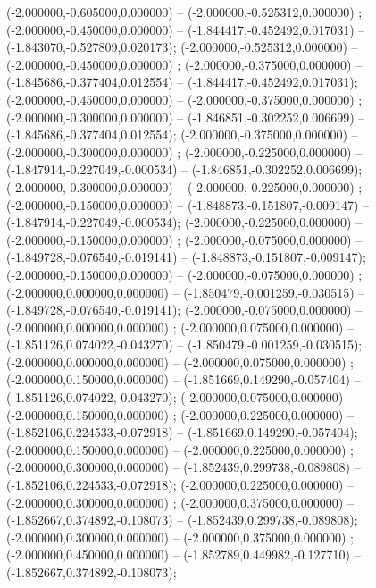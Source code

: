  (-2.000000,-0.605000,0.000000) -- (-2.000000,-0.525312,0.000000) ;
 (-2.000000,-0.450000,0.000000) -- (-1.844417,-0.452492,0.017031) -- (-1.843070,-0.527809,0.020173);
 (-2.000000,-0.525312,0.000000) -- (-2.000000,-0.450000,0.000000) ;
 (-2.000000,-0.375000,0.000000) -- (-1.845686,-0.377404,0.012554) -- (-1.844417,-0.452492,0.017031);
 (-2.000000,-0.450000,0.000000) -- (-2.000000,-0.375000,0.000000) ;
 (-2.000000,-0.300000,0.000000) -- (-1.846851,-0.302252,0.006699) -- (-1.845686,-0.377404,0.012554);
 (-2.000000,-0.375000,0.000000) -- (-2.000000,-0.300000,0.000000) ;
 (-2.000000,-0.225000,0.000000) -- (-1.847914,-0.227049,-0.000534) -- (-1.846851,-0.302252,0.006699);
 (-2.000000,-0.300000,0.000000) -- (-2.000000,-0.225000,0.000000) ;
 (-2.000000,-0.150000,0.000000) -- (-1.848873,-0.151807,-0.009147) -- (-1.847914,-0.227049,-0.000534);
 (-2.000000,-0.225000,0.000000) -- (-2.000000,-0.150000,0.000000) ;
 (-2.000000,-0.075000,0.000000) -- (-1.849728,-0.076540,-0.019141) -- (-1.848873,-0.151807,-0.009147);
 (-2.000000,-0.150000,0.000000) -- (-2.000000,-0.075000,0.000000) ;
 (-2.000000,0.000000,0.000000) -- (-1.850479,-0.001259,-0.030515) -- (-1.849728,-0.076540,-0.019141);
 (-2.000000,-0.075000,0.000000) -- (-2.000000,0.000000,0.000000) ;
 (-2.000000,0.075000,0.000000) -- (-1.851126,0.074022,-0.043270) -- (-1.850479,-0.001259,-0.030515);
 (-2.000000,0.000000,0.000000) -- (-2.000000,0.075000,0.000000) ;
 (-2.000000,0.150000,0.000000) -- (-1.851669,0.149290,-0.057404) -- (-1.851126,0.074022,-0.043270);
 (-2.000000,0.075000,0.000000) -- (-2.000000,0.150000,0.000000) ;
 (-2.000000,0.225000,0.000000) -- (-1.852106,0.224533,-0.072918) -- (-1.851669,0.149290,-0.057404);
 (-2.000000,0.150000,0.000000) -- (-2.000000,0.225000,0.000000) ;
 (-2.000000,0.300000,0.000000) -- (-1.852439,0.299738,-0.089808) -- (-1.852106,0.224533,-0.072918);
 (-2.000000,0.225000,0.000000) -- (-2.000000,0.300000,0.000000) ;
 (-2.000000,0.375000,0.000000) -- (-1.852667,0.374892,-0.108073) -- (-1.852439,0.299738,-0.089808);
 (-2.000000,0.300000,0.000000) -- (-2.000000,0.375000,0.000000) ;
 (-2.000000,0.450000,0.000000) -- (-1.852789,0.449982,-0.127710) -- (-1.852667,0.374892,-0.108073);
